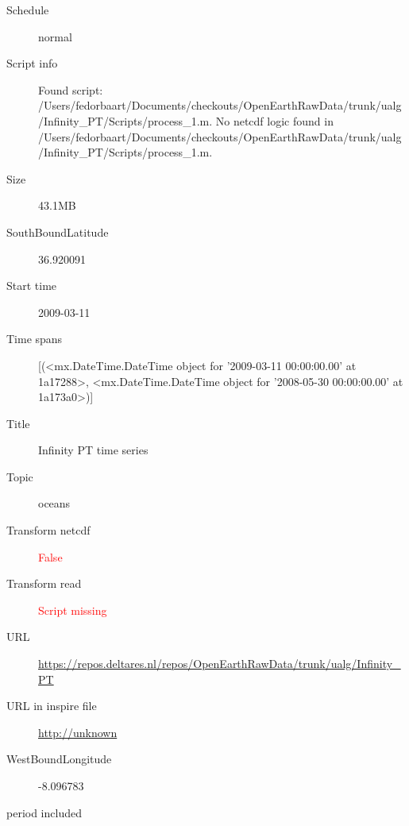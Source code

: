 \documentclass[9]{report}
\begin{document}
\begin{description}
\begin{verbatim}
\end{verbatim}
  \item[Schedule] normal
  \item[Script info] Found script: /Users/fedorbaart/Documents/checkouts/OpenEarthRawData/trunk/ualg/Infinity\_PT/Scripts/process\_1.m.
No netcdf logic found in /Users/fedorbaart/Documents/checkouts/OpenEarthRawData/trunk/ualg/Infinity\_PT/Scripts/process\_1.m.
  \item[Size] 43.1MB
  \item[SouthBoundLatitude] 36.920091
  \item[Start time] 2009-03-11
  \item[Time spans] [(<mx.DateTime.DateTime object for '2009-03-11 00:00:00.00' at 1a17288>, <mx.DateTime.DateTime object for '2008-05-30 00:00:00.00' at 1a173a0>)]
  \item[Title]  Infinity PT time series 
  \item[Topic] oceans
  \item[Transform netcdf] \textcolor{red}{False}
  \item[Transform read] \textcolor{red}{Script missing}
  \item[URL] \href{https://repos.deltares.nl/repos/OpenEarthRawData/trunk/ualg/Infinity\_PT}{https://repos.deltares.nl/repos/OpenEarthRawData/trunk/ualg/Infinity\_PT}
  \item[URL in inspire file] \href{http://unknown}{http://unknown}
  \item[WestBoundLongitude] -8.096783
  \item[period included] 
\end{description}
\end{document}
